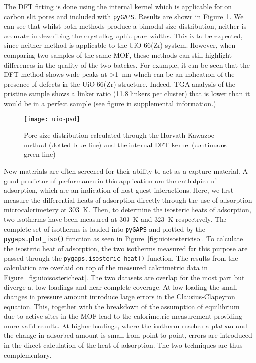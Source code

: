 The DFT fitting is done using the internal kernel
which is applicable for  on carbon slit pores and included with \texttt{pyGAPS}. 
Results are shown in Figure~\ref{fig:uiopsd}. We can see that whilst both methods
produce a bimodal size distribution, neither is accurate in describing the crystallographic pore
widths. This is to be expected, since neither method is applicable to the UiO-66(Zr)
system. However, when comparing two samples of the same MOF, these methods can still
highlight differences in the quality of the two batches. For example, it can be seen
that the DFT method shows wide peaks at >\SI{1}{\nano\meter}
which can be an indication of the presence of defects in the UiO-66(Zr) structure.
Indeed, TGA analysis of the pristine sample shows a linker ratio (11.8 linkers per cluster)
that is lower than it would be in a perfect sample (see figure in supplemental information.) 

\begin{figure}[ht]
    \texttt{[image: uio-psd]}
    \caption{Pore size distribution calculated through the Horvath-Kawazoe method (dotted 
    blue line) and the internal DFT kernel (continuous green line)}%
    \label{fig:uiopsd}
\end{figure}

New materials are often screened for their ability to act as a  capture material. 
A good predictor of performance 
in this application are the enthalpies of adsorption, which are an indication of
host-guest interactions. Here, we first measure the differential heats of adsorption
directly through the use of adsorption microcalorimetery at \SI{303}{\kelvin}. 
Then, to determine the isosteric heats of adsorption,
two isotherms have been measured at \SI{303}{\kelvin} and \SI{323}{\kelvin} respectively. 
The complete set of isotherms is loaded into \texttt{pyGAPS} and plotted by the 
\lstinline{pygaps.plot_iso()} function as seen in Figure~\ref{fig:uioisostericiso}. 
To calculate the isosteric heat
of adsorption, the two isotherms measured for this purpose are passed through the 
\lstinline{pygaps.isosteric_heat()} function. The results from the calculation are overlaid 
on top of the measured calorimetric data in 
Figure~\ref{fig:uioisostericheat}. The two datasets are
overlap for the most part but diverge at low loadings and near complete coverage.
At low loading the small changes in pressure amount introduce large errors in the 
Clausius-Clapeyron equation. This, together with the breakdown of the 
assumption of equilibrium due to active sites in the MOF lead to the calorimetric
measurement providing more valid results. At higher loadings, where the isotherm reaches
a plateau and the change in adsorbed amount is small from point to point, errors are
introduced in the direct calculation of the heat of adsorption. The two techniques are thus 
complementary.  

